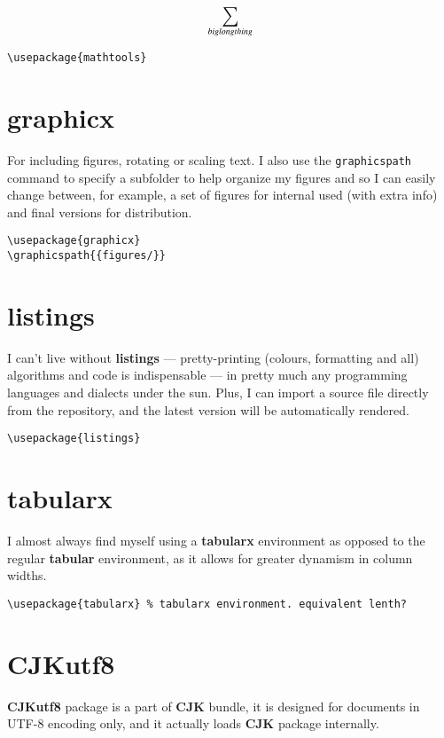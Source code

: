 \begin{equation*}
\sum_{\mathclap{big long thing}}
\end{equation*}

\begin{lstlisting}[language={[LaTeX]TeX}]
\usepackage{mathtools}
\end{lstlisting}

\section{graphicx}
For including figures, rotating or scaling text. I also use the \lstinline[language={[LaTeX]TeX}]|graphicspath| command to specify a subfolder to help organize my figures and so I can easily change between, for example, a set of figures for internal used (with extra info) and final versions for distribution.

\begin{lstlisting}[language={[LaTeX]TeX}]
\usepackage{graphicx}
\graphicspath{{figures/}}
\end{lstlisting}

\section{listings}
I can't live without \textbf{listings} --- pretty-printing (colours, formatting and all) algorithms and code is indispensable --- in pretty much any programming languages and dialects under the sun. Plus, I can import a source file directly from the repository, and the latest version will be automatically rendered.

\begin{lstlisting}[language={[LaTeX]TeX}]
\usepackage{listings}
\end{lstlisting}

\section{tabularx}
I almost always find myself using a \textbf{tabularx} environment as opposed to the regular \textbf{tabular} environment, as it allows for greater dynamism in column widths.

\begin{lstlisting}[language={[LaTeX]TeX}]
\usepackage{tabularx} % tabularx environment. equivalent lenth?
\end{lstlisting}

\section{CJKutf8}
\textbf{CJKutf8} package is a part of \textbf{CJK} bundle, it is designed for documents in UTF-8 encoding only, and it actually loads \textbf{CJK} package internally.

